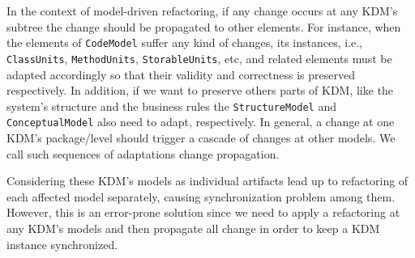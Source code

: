 In the context of model-driven  refactoring, if any change occurs at any KDM's subtree the change should be propagated to other elements.
%
%
For instance, when the elements of \texttt{CodeModel} suffer any kind of changes, its instances, i.e., \texttt{ClassUnits}, \texttt{MethodUnits}, \texttt{StorableUnits}, etc, and related elements must be adapted accordingly so that their validity and correctness is preserved respectively. In addition, if we want to preserve others parts of KDM, like the system's structure and the business rules the  \texttt{StructureModel} and \texttt{ConceptualModel} also need to adapt, respectively. %
In general, a change at one KDM's package/level should trigger a cascade of changes at other models. We call such sequences of adaptations change propagation.


Considering these KDM's models as individual artifacts lead up to refactoring of each affected model separately, causing synchronization problem among them. However, this is an error-prone solution since we need to apply a refactoring at any KDM's models and then propagate all change in order to keep a KDM instance synchronized. %


 
